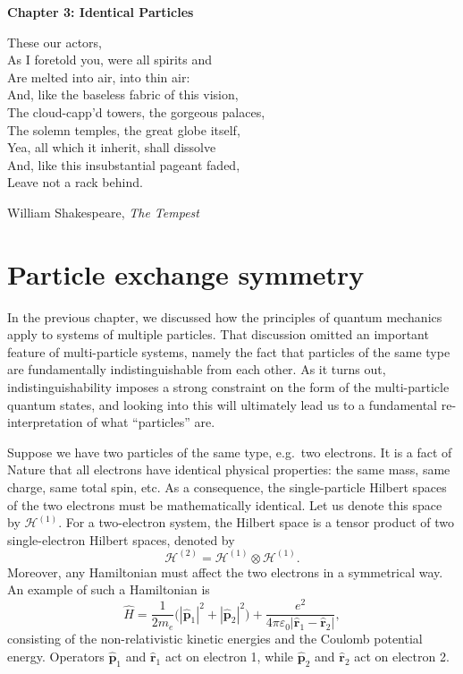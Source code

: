 \documentclass[pra,12pt]{revtex4}
\begin{document}
\begin{center}
{\Large \textbf{Chapter 3: Identical Particles}}
\end{center}

\epigraph{These our actors,\\As I foretold you, were all spirits
  and\\Are melted into air, into thin air: \\And, like the baseless
  fabric of this vision,\\ The cloud-capp'd towers, the gorgeous
  palaces,\\ The solemn temples, the great globe itself,\\ Yea, all
  which it inherit, shall dissolve\\And, like this insubstantial
  pageant faded, \\ Leave not a rack behind.}{William Shakespeare,
  \textit{The Tempest}}


\section{Particle exchange symmetry}

In the previous chapter, we discussed how the principles of quantum
mechanics apply to systems of multiple particles.  That discussion
omitted an important feature of multi-particle systems, namely the
fact that particles of the same type are fundamentally
indistinguishable from each other.  As it turns out,
indistinguishability imposes a strong constraint on the form of the
multi-particle quantum states, and looking into this will ultimately
lead us to a fundamental re-interpretation of what ``particles'' are.

Suppose we have two particles of the same type, e.g.~two electrons.
It is a fact of Nature that all electrons have identical physical
properties: the same mass, same charge, same total spin, etc.  As a
consequence, the single-particle Hilbert spaces of the two electrons
must be mathematically identical.  Let us denote this space by
$\mathscr{H}^{(1)}$.  For a two-electron system, the Hilbert space is
a tensor product of two single-electron Hilbert spaces, denoted by
$$\mathscr{H}^{(2)} = \mathscr{H}^{(1)} \otimes \mathscr{H}^{(1)}.$$
Moreover, any Hamiltonian must affect the two electrons in a
symmetrical way.  An example of such a Hamiltonian is
$$\hat{H} = \frac{1}{2m_e} \Big(|\hat{\mathbf{p}}_1|^2 + |\hat{\mathbf{p}}_2|^2\Big) + \frac{e^2}{4\pi\varepsilon_0|\hat{\mathbf{r}}_1 - \hat{\mathbf{r}}_2|},$$
consisting of the non-relativistic kinetic energies and the Coulomb
potential energy.  Operators $\hat{\mathbf{p}}_1$ and
$\hat{\mathbf{r}}_1$ act on electron 1, while $\hat{\mathbf{p}}_2$ and
$\hat{\mathbf{r}}_2$ act on electron 2.
\end{document}
